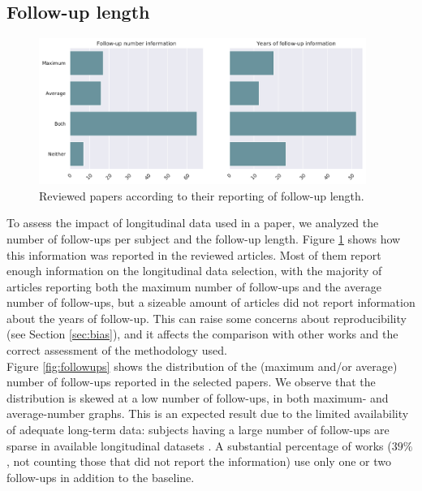 \subsection{Follow-up length} 
 
 \begin{figure}[!htbp]
\centering
\includegraphics[width=0.95\textwidth]{figures/review/Fig2.pdf}
    \caption{Reviewed papers according to their reporting of follow-up length.}\label{fig:followupsdist}
\end{figure}
 
To assess the impact of longitudinal data used in a paper, we analyzed the number of follow-ups per subject and the follow-up length. Figure \ref{fig:followupsdist} shows how this information was reported in the reviewed articles. Most of them report enough information on the longitudinal data selection, with the majority of articles reporting both the maximum number of follow-ups and the average number of follow-ups, but a sizeable amount of articles did not report information about the years of follow-up. This can raise some concerns about reproducibility (see Section \ref{sec:bias}), and it affects the comparison with other works and the correct assessment of the methodology used. \\

Figure \ref{fig:followups} shows the distribution of the (maximum and/or average) number of follow-ups reported in the selected papers. We observe that the distribution is skewed at a low number of follow-ups, in both maximum- and average-number graphs. This is an expected result due to the limited availability of adequate long-term data: subjects having a large number of follow-ups are sparse in available longitudinal datasets \cite{Lawrence2017}. A substantial percentage of works ($39\%$, not counting those that did not report the information) use only one or two follow-ups in addition to the baseline. \\

